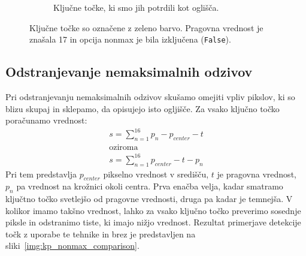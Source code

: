 \documentclass[a4paper,11pt]{article}
\begin{document}
\begin{figure}[hb]
\begin{subfigure}[t]{0.48\textwidth}
		\caption{Ključne točke, ki smo jih potrdili kot oglišča.}
		\label{img:kp_high_speed}
	\end{subfigure}
	\caption{Ključne točke so označene z zeleno barvo. Pragovna vrednost je znašala 17 in opcija nonmax je bila izključena (\texttt{False}).}
	\label{img:kp_speed_comparison}
\end{figure}

\subsection{Odstranjevanje nemaksimalnih odzivov}

Pri odstranjevanju nemaksimalnih odzivov skušamo omejiti vpliv pikslov, ki so blizu skupaj in sklepamo, da opisujejo isto ogljišče. Za vsako ključno točko poračunamo vrednost:
\begin{equation}
	\begin{gathered}
	s = \sum_{n=1}^{16}{p_n - p_{center} - t} \\
	\text{oziroma} \\
	s = \sum_{n=1}^{16}{p_{center} - t - p_n}
	\end{gathered}
\end{equation}
Pri tem predstavlja $p_{center}$ pikselno vrednost v središču, $t$ je pragovna vrednost, $p_n$ pa vrednost na krožnici okoli centra.
Prva enačba velja, kadar smatramo ključtno točko svetlejšo od pragovne vrednosti, druga pa kadar je temnejša. V kolikor imamo takšno vrednost, lahko za vsako ključno točko preverimo sosednje piksle in odstranimo tiste, ki imajo nižjo vrednost. Rezultat primerjave detekcije točk z uporabe te tehnike in brez je predstavljen na sliki~\ref{img:kp_nonmax_comparison}.
\end{document}
